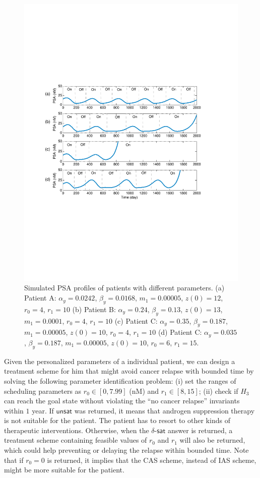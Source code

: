 \begin{figure}[htb]
\centering
\includegraphics[scale=0.52]{fig-prostatetraj2}
\caption{Simulated PSA profiles of patients with different parameters. (a) Patient A: $\alpha_y=0.0242$, $\beta_y=0.0168$, $m_1=0.00005$, $z(0)=12$, $r_0=4$, $r_1=10$ (b) Patient B: $\alpha_y=0.24$, $\beta_y=0.13$, $z(0)=13$, $m_1=0.0001$, $r_0=4$, $r_1=10$ (c) Patient C: $\alpha_y=0.35$, $\beta_y=0.187$, $m_1=0.00005$, $z(0)=10$, $r_0=4$, $r_1=10$ (d) Patient C: $\alpha_y=0.035$, $\beta_y=0.187$, $m_1=0.00005$, $z(0)=10$, $r_0=6$, $r_1=15$.}
\label{patients}
\end{figure}

Given the personalized parameters of a individual patient, we can design a treatment scheme for him that might avoid cancer relapse with bounded time by solving the following parameter identification problem: (i) set the ranges of scheduling parameters as $r_0 \in [0,7.99]$ (nM) and $r_1 \in [8,15]$; (ii) check if $H_3$ can reach the goal state without violating the ``no cancer relapse'' invariants within $1$ year. If $\mathsf{unsat}$ was returned, it means that androgen suppression therapy is not suitable for the patient. The patient has to resort to other kinds of therapeutic interventions. Otherwise, when the $\delta$-$\mathsf{sat}$ answer is returned, a treatment scheme containing feasible values of $r_0$ and $r_1$ will also be returned, which could help preventing or delaying the relapse within bounded time. Note that if $r_0=0$ is returned, it implies that the CAS scheme, instead of IAS scheme, might be more suitable for the patient.

